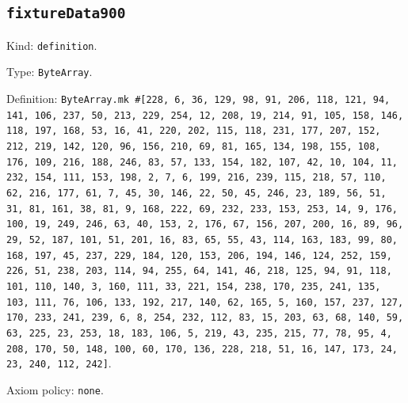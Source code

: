\documentclass[11pt]{article}
\begin{document}
\subsection*{\texttt{fixtureData900}}
\noindent Kind: \texttt{definition}.\par
\noindent Type: \texttt{ByteArray}.\par
\noindent Definition: \texttt{ByteArray.mk \#[228, 6, 36, 129, 98, 91, 206, 118, 121, 94, 141, 106, 237, 50, 213, 229, 254, 12, 208, 19, 214, 91, 105, 158, 146, 118, 197, 168, 53, 16, 41, 220, 202, 115, 118, 231, 177, 207, 152, 212, 219, 142, 120, 96, 156, 210, 69, 81, 165, 134, 198, 155, 108, 176, 109, 216, 188, 246, 83, 57, 133, 154, 182, 107, 42, 10, 104, 11, 232, 154, 111, 153, 198, 2, 7, 6, 199, 216, 239, 115, 218, 57, 110, 62, 216, 177, 61, 7, 45, 30, 146, 22, 50, 45, 246, 23, 189, 56, 51, 31, 81, 161, 38, 81, 9, 168, 222, 69, 232, 233, 153, 253, 14, 9, 176, 100, 19, 249, 246, 63, 40, 153, 2, 176, 67, 156, 207, 200, 16, 89, 96, 29, 52, 187, 101, 51, 201, 16, 83, 65, 55, 43, 114, 163, 183, 99, 80, 168, 197, 45, 237, 229, 184, 120, 153, 206, 194, 146, 124, 252, 159, 226, 51, 238, 203, 114, 94, 255, 64, 141, 46, 218, 125, 94, 91, 118, 101, 110, 140, 3, 160, 111, 33, 221, 154, 238, 170, 235, 241, 135, 103, 111, 76, 106, 133, 192, 217, 140, 62, 165, 5, 160, 157, 237, 127, 170, 233, 241, 239, 6, 8, 254, 232, 112, 83, 15, 203, 63, 68, 140, 59, 63, 225, 23, 253, 18, 183, 106, 5, 219, 43, 235, 215, 77, 78, 95, 4, 208, 170, 50, 148, 100, 60, 170, 136, 228, 218, 51, 16, 147, 173, 24, 23, 240, 112, 242]}.\par
\noindent Axiom policy: \texttt{none}.\par
\end{document}
